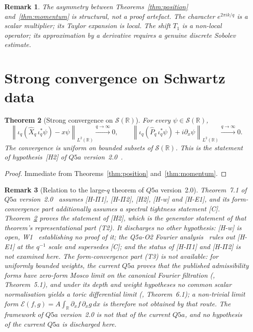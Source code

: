 \documentclass[12pt,a4paper]{article}
\newtheorem{theorem}{Theorem}[section]
\newtheorem{remark}[theorem]{Remark}
\newcommand{\Schwartz}{\mathcal{S}(\mathbb{R})}
\newcommand{\iotaq}{\iota_q}
\newcommand{\iotastar}{\iota_q^*}
\newcommand{\Xhat}{\hat{X}_q}
\newcommand{\Phat}{\hat{P}_q}
\newcommand{\norm}[1]{\left\|#1\right\|}
\begin{document}
    \begin{remark}
      The asymmetry between Theorems~\ref{thm:position} and~\ref{thm:momentum}
      is structural, not a proof artefact.
      The character $e^{2\pi ik/q}$ is a scalar multiplier; its Taylor expansion is local.
      The shift $T_1$ is a non-local operator; its approximation by a derivative requires
      a genuine discrete Sobolev estimate.
    \end{remark}

    \newpage
  \section{Strong convergence on Schwartz data}
    \label{sec:schwartz}

    \begin{theorem}[Strong convergence on $\Schwartz$]
      \label{thm:schwartz}
      For every $\psi \in \Schwartz$,
      \[
        \norm{\iotaq(\Xhat\,\iotastar\psi) - x\psi}_{L^2(\mathbb{R})} \xrightarrow{q \to \infty} 0,
        \qquad
        \norm{\iotaq(\Phat\,\iotastar\psi) + i\partial_x\psi}_{L^2(\mathbb{R})} \xrightarrow{q \to \infty} 0.
      \]
      The convergence is uniform on bounded subsets of $\Schwartz$.
      This is the statement of hypothesis~\textup{[H2]} of $Q5a$ version~2.0~\cite{Beau2026q5a}.
    \end{theorem}

    \begin{proof}
      Immediate from Theorems~\ref{thm:position} and~\ref{thm:momentum}.
    \end{proof}

    \begin{remark}[Relation to the large-$q$ theorem of $Q5a$ version~2.0]
      \label{rem:Q5a-consequence}
      Theorem~7.1 of $Q5a$ version~2.0~\cite{Beau2026q5a} assumes [H-$\Pi$1], [H-$\Pi$2], [H2],
      [H-w] and [H-E1], and its form-convergence part additionally assumes a spectral tightness
      statement [C].
      Theorem~\ref{thm:schwartz} proves the statement of [H2], which is the generator statement of
      that theorem's representational part (T2).
      It discharges no other hypothesis: [H-w] is open, W1~\cite{Beau2026w1} establishing no
      proof of it; the Q5a-O2 Fourier analysis~\cite{Beau2026q5ao2} rules out [H-E1] at the
      $q^{-1}$ scale and supersedes [C]; and the status of [H-$\Pi$1] and [H-$\Pi$2] is not examined
      here.
      The form-convergence part (T3) is not available: for uniformly bounded weights, the current
      $Q5a$ proves that the published admissibility forms have zero-form Mosco limit on the
      canonical Fourier filtration (\cite{Beau2026q5a}, Theorem~5.1), and under its depth and weight hypotheses no common
      scalar normalisation yields a toric differential limit (\cite{Beau2026q5a}, Theorem~6.1);
      a non-trivial limit form $\mathcal{E}(f,g) = A\int_{\mathbb{R}} \partial_x f\,
      \partial_x g\,dx$ is therefore not obtained by that route.
      The framework of $Q5a$ version~2.0 is not that of the current $Q5a$, and no hypothesis of the
      current $Q5a$ is discharged here.
    \end{remark}
\end{document}
